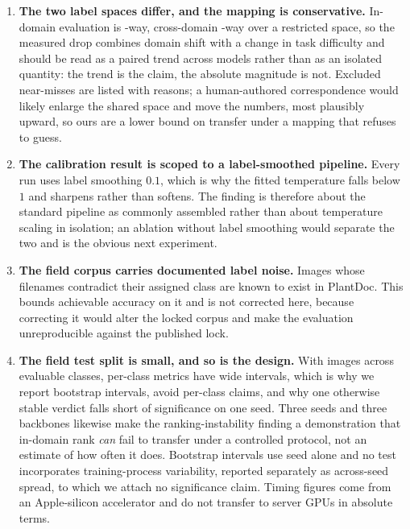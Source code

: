 \documentclass[runningheads]{llncs}
\begin{document}
\begin{enumerate}
\item \textbf{The two label spaces differ, and the mapping is conservative.}
In-domain evaluation is \NPvClasses{}-way, cross-domain \NSharedClasses{}-way
over a restricted space, so the measured drop combines domain shift with a change
in task difficulty and should be read as a paired trend across models rather than
as an isolated quantity: the trend is the claim, the absolute magnitude is not.
Excluded near-misses are listed with reasons; a human-authored correspondence
would likely enlarge the shared space and move the numbers, most plausibly
upward, so ours are a lower bound on transfer under a mapping that refuses to
guess.

\item \textbf{The calibration result is scoped to a label-smoothed pipeline.}
Every run uses label smoothing $0.1$, which is why the fitted temperature falls
below $1$ and sharpens rather than softens. The finding is therefore about the
standard pipeline as commonly assembled rather than about temperature scaling in
isolation; an ablation without label smoothing would separate the two and is the
obvious next experiment.

\item \textbf{The field corpus carries documented label noise.} Images whose
filenames contradict their assigned class are known to exist in PlantDoc. This
bounds achievable accuracy on it and is not corrected here, because correcting
it would alter the locked corpus and make the evaluation unreproducible against
the published lock.

\item \textbf{The field test split is small, and so is the design.} With
\NPdcTest{} images across \NPdcTestClasses{} evaluable classes, per-class metrics
have wide intervals, which is why we report bootstrap intervals, avoid per-class
claims, and why one otherwise stable verdict falls short of significance on one
seed. Three seeds and three backbones likewise make the ranking-instability
finding a demonstration that in-domain rank \emph{can} fail to transfer under a
controlled protocol, not an estimate of how often it does. Bootstrap intervals
use seed \SigSeed{} alone and no test incorporates training-process variability,
reported separately as across-seed spread, to which we attach no significance
claim. Timing figures come from an Apple-silicon accelerator and do not transfer
to server GPUs in absolute terms.


\end{enumerate}
\end{document}
